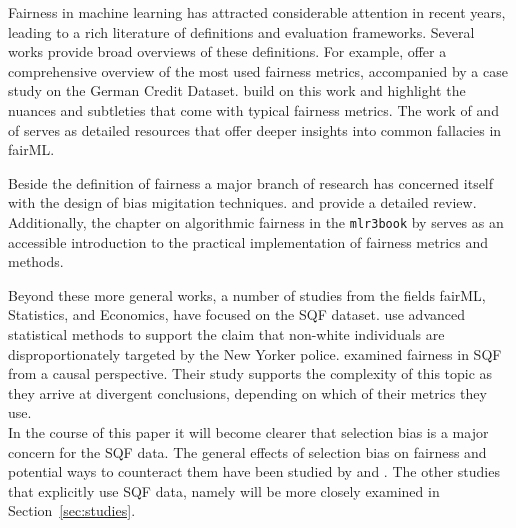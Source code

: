 Fairness in machine learning has attracted considerable attention in recent years, leading to a rich literature of definitions and evaluation frameworks. Several works provide broad overviews of these definitions. For example, \cite{verma2018} offer a comprehensive overview of the most used fairness metrics, accompanied by a case study on the German Credit Dataset. \cite{castelnovo2022} build on this work and highlight the nuances and subtleties that come with typical fairness metrics. The work of \cite{corbett-davies} and of \cite{barocas-hardt-narayanan} serves as detailed resources that offer deeper insights into common fallacies in fairML.

Beside the definition of fairness a major branch of research has concerned itself with the design of bias migitation techniques. \cite{mehrabi2022} and \cite{caton2024} provide a detailed review. Additionally, the chapter on algorithmic fairness in the \texttt{mlr3book} by \cite{mlr3_book} serves as an accessible introduction to the practical implementation of fairness metrics and methods.\par

Beyond these more general works, a number of studies from the fields fairML, Statistics, and Economics, have focused on the SQF dataset.
\cite{goel2016} use advanced statistical methods to support the claim that non-white individuals are disproportionately targeted by the New Yorker police.
\cite{Khademi2019FADMELC} examined fairness in SQF from a causal perspective. Their study supports the complexity of this topic as they arrive at divergent conclusions, depending on which of their metrics they use.\\
In the course of this paper it will become clearer that selection bias is a major concern for the SQF data. The general effects of selection bias on fairness and potential ways to counteract them have been studied by \cite{Lakkaraju2017SLPEAPPU} and \cite{favier2023}.
The other studies that explicitly use SQF data, namely \cite{Badr2022DTFANSP, rambachan2016, kallus2018} will be more closely examined in Section~\ref{sec:studies}.

